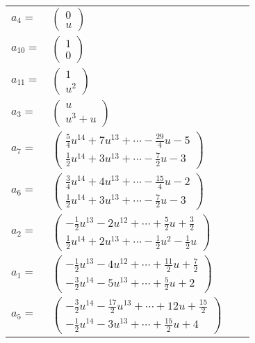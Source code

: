 \documentclass[1p]{elsarticle_modified}
\theoremstyle{definition}
\begin{document}
\begin{tabular}{m{7pt} m{180pt} m{7pt} m{180pt} }
\flushright $a_{4}=$&$\begin{pmatrix}0\\u\end{pmatrix}$ \\
\flushright $a_{10}=$&$\begin{pmatrix}1\\0\end{pmatrix}$ \\
\flushright $a_{11}=$&$\begin{pmatrix}1\\u^2\end{pmatrix}$ \\
\flushright $a_{3}=$&$\begin{pmatrix}u\\u^3+u\end{pmatrix}$ \\
\flushright $a_{7}=$&$\begin{pmatrix}\frac{5}{4} u^{14}+7 u^{13}+\cdots-\frac{29}{4} u-5\\\frac{1}{2} u^{14}+3 u^{13}+\cdots-\frac{7}{2} u-3\end{pmatrix}$ \\
\flushright $a_{6}=$&$\begin{pmatrix}\frac{3}{4} u^{14}+4 u^{13}+\cdots-\frac{15}{4} u-2\\\frac{1}{2} u^{14}+3 u^{13}+\cdots-\frac{7}{2} u-3\end{pmatrix}$ \\
\flushright $a_{2}=$&$\begin{pmatrix}-\frac{1}{2} u^{13}-2 u^{12}+\cdots+\frac{5}{2} u+\frac{3}{2}\\\frac{1}{2} u^{14}+2 u^{13}+\cdots-\frac{1}{2} u^2-\frac{1}{2} u\end{pmatrix}$ \\
\flushright $a_{1}=$&$\begin{pmatrix}-\frac{1}{2} u^{13}-4 u^{12}+\cdots+\frac{11}{2} u+\frac{7}{2}\\-\frac{3}{2} u^{14}-5 u^{13}+\cdots+\frac{5}{2} u+2\end{pmatrix}$ \\
\flushright $a_{5}=$&$\begin{pmatrix}-\frac{3}{2} u^{14}-\frac{17}{2} u^{13}+\cdots+12 u+\frac{15}{2}\\-\frac{1}{2} u^{14}-3 u^{13}+\cdots+\frac{15}{2} u+4\end{pmatrix}$ \\

\end{tabular}
\end{document}
